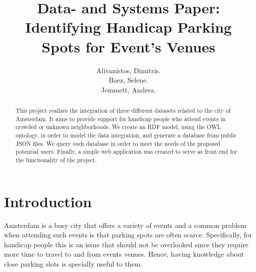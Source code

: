 \documentclass[runningheads,a4paper]{../../StyleFiles/llncs}
\begin{document}
\mainmatter  %

\title{Data- and Systems Paper: Identifying Handicap Parking Spots for Event's Venues}


%
%
\author{Alivanistos, Dimitris. \\ Baez, Selene. \\ Jemmett, Andrea. }
%


\maketitle


\begin{abstract}
	This project realizes the integration of three different datasets related to the city of Amsterdam. It aims to provide support for handicap people who attend events in crowded or unknown neighborhoods.
	We create an RDF model, using the OWL ontology, in order to model the data integration, and generate a database from public JSON files. We query such database in order to meet the needs of the proposed potential users. Finally, a simple web application was created to serve as front end for the functionality of the project. 
\end{abstract}


\section{Introduction}
Amsterdam is a busy city that offers a variety of events and a common problem when attending such events is that parking spots are often scarce. Specifically, for handicap people this is an issue that should not be overlooked since they require more time to travel to and from events venues. Hence, having knowledge about close parking slots is specially useful to them. 
\end{document}
